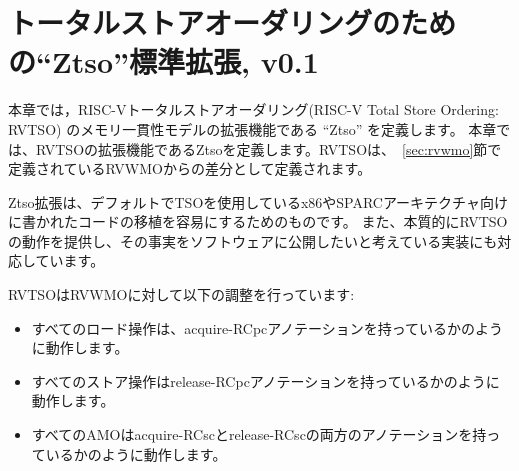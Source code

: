 \begin{comment}
\chapter{``Ztso'' Standard Extension for Total Store Ordering, v0.1}
\end{comment}
\chapter{トータルストアオーダリングのための``Ztso''標準拡張, v0.1}
\label{sec:ztso}

\begin{comment}
This chapter defines the ``Ztso'' extension for the RISC-V Total Store Ordering (RVTSO) memory consistency model.
RVTSO is defined as a delta from RVWMO, which is defined in Chapter~\ref{sec:rvwmo}.
\end{comment}
本章では，RISC-Vトータルストアオーダリング(RISC-V Total Store Ordering: RVTSO) のメモリ一貫性モデルの拡張機能である ``Ztso'' を定義します。
本章では、RVTSOの拡張機能であるZtsoを定義します。RVTSOは、~\ref{sec:rvwmo}節で定義されているRVWMOからの差分として定義されます。

\begin{commentary}
  \begin{comment}
  The Ztso extension is meant to facilitate the porting of code originally written for the x86 or SPARC architectures, both of which use TSO by default.
  It also supports implementations which inherently provide RVTSO behavior and want to expose that fact to software.
  \end{comment}
  Ztso拡張は、デフォルトでTSOを使用しているx86やSPARCアーキテクチャ向けに書かれたコードの移植を容易にするためのものです。
  また、本質的にRVTSOの動作を提供し、その事実をソフトウェアに公開したいと考えている実装にも対応しています。
\end{commentary}

\begin{comment}
RVTSO makes the following adjustments to RVWMO:
\end{comment}
RVTSOはRVWMOに対して以下の調整を行っています:

\begin{comment}
\begin{itemize}
  \item All load operations behave as if they have an acquire-RCpc annotation
  \item All store operations behave as if they have a release-RCpc annotation.
  \item All AMOs behave as if they have both acquire-RCsc and release-RCsc annotations.
\end{itemize}
\end{comment}
\begin{itemize}
\item すべてのロード操作は、acquire-RCpcアノテーションを持っているかのように動作します。
\item すべてのストア操作はrelease-RCpcアノテーションを持っているかのように動作します。
\item すべてのAMOはacquire-RCscとrelease-RCscの両方のアノテーションを持っているかのように動作します。
\end{itemize}

